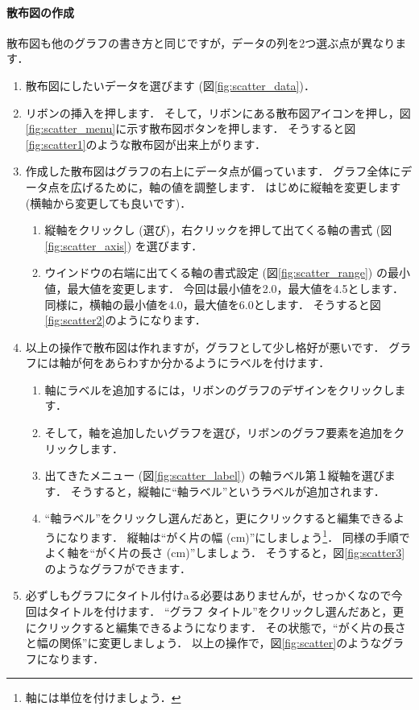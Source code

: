 \paragraph{散布図の作成}

散布図も他のグラフの書き方と同じですが，データの列を2つ選ぶ点が異なります．

\begin{enumerate}
    \item 散布図にしたいデータを選びます (図\ref{fig:scatter_data})．
    \item リボンの挿入を押します．
    そして，リボンにある散布図アイコンを押し，図\ref{fig:scatter_menu}に示す散布図ボタンを押します．
    そうすると図\ref{fig:scatter1}のような散布図が出来上がります．
    \item 作成した散布図はグラフの右上にデータ点が偏っています．
    グラフ全体にデータ点を広げるために，軸の値を調整します．
    はじめに縦軸を変更します (横軸から変更しても良いです)．
    \begin{enumerate}
        \item 縦軸をクリックし (選び)，右クリックを押して出てくる軸の書式 (図\ref{fig:scatter_axis}) を選びます．
        \item ウインドウの右端に出てくる軸の書式設定 (図\ref{fig:scatter_range}) の最小値，最大値を変更します．
        今回は最小値を2.0，最大値を4.5とします．
        同様に，横軸の最小値を4.0，最大値を6.0とします．
        そうすると図\ref{fig:scatter2}のようになります．
    \end{enumerate}
    \item 以上の操作で散布図は作れますが，グラフとして少し格好が悪いです．
    グラフには軸が何をあらわすか分かるようにラベルを付けます．
    \begin{enumerate}
        \item 軸にラベルを追加するには，リボンのグラフのデザインをクリックします．
        \item そして，軸を追加したいグラフを選び，リボンのグラフ要素を追加をクリックします．
        \item 出てきたメニュー (図\ref{fig:scatter_label}) の軸ラベル第１縦軸を選びます．
        そうすると，縦軸に``軸ラベル''というラベルが追加されます．
        \item ``軸ラベル''をクリックし選んだあと，更にクリックすると編集できるようになります．
        縦軸は``がく片の幅 (cm)''にしましょう\footnote{軸には単位を付けましょう．}．
        同様の手順でよく軸を``がく片の長さ (cm)''しましょう．
        そうすると，図\ref{fig:scatter3}のようなグラフができます．
    \end{enumerate}
    \item 必ずしもグラフにタイトル付けaる必要はありませんが，せっかくなので今回はタイトルを付けます．
    ``グラフ タイトル''をクリックし選んだあと，更にクリックすると編集できるようになります．
    その状態で，``がく片の長さと幅の関係''に変更しましょう．
    以上の操作で，図\ref{fig:scatter}のようなグラフになります．
\end{enumerate}


